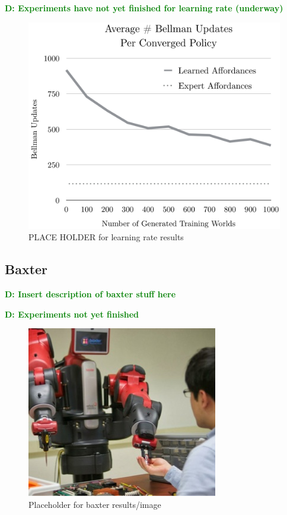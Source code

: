\documentclass[conference]{IEEEtran}
\newcommand{\dnote}[1]{\textcolor{Green}{\textbf{D: #1}}}
\begin{document}
\dnote{Experiments have not yet finished for learning rate (underway)}

\begin{figure}[H]
\centering
\includegraphics[scale=0.195]{figures/training_results.png}%
  \caption{PLACE HOLDER for learning rate results}
  \label{fig:training_results}
\end{figure}

\subsection{Baxter}

\dnote{Insert description of baxter stuff here}

\dnote{Experiments not yet finished}

\begin{figure}[H]
\centering
\includegraphics[scale=0.195]{figures/baxter_temp.jpg}%
  \caption{Placeholder for baxter results/image}
  \label{fig:baxter_results}
\end{figure}
\end{document}
